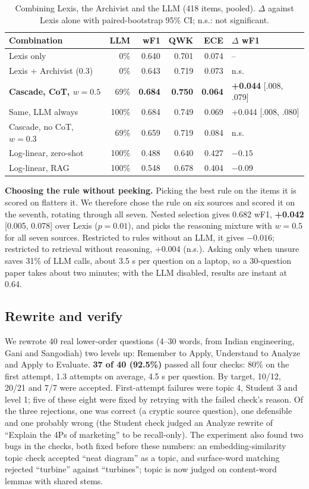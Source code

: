 \documentclass[conference]{IEEEtran}
\newcommand{\best}[1]{\textbf{#1}}
\begin{document}
\begin{table}[t]
\caption{Combining Lexis, the Archivist and the LLM (418 items, pooled). $\Delta$ against Lexis
alone with paired-bootstrap 95\% CI; n.s.: not significant.}
\label{tab:arbiter}
\centering\scriptsize
\setlength{\tabcolsep}{2pt}
\begin{tabular}{@{}lrrrrl@{}}
\toprule
Combination & LLM & wF1 & QWK & ECE & $\Delta$ wF1 \\
\midrule
Lexis only & 0\% & 0.640 & 0.701 & 0.074 & -- \\
Lexis + Archivist (0.3) & 0\% & 0.643 & 0.719 & 0.073 & n.s. \\
\best{Cascade, CoT, $w{=}0.5$} & 69\% & \best{0.684} & \best{0.750} & \best{0.064} & \best{+0.044} [.008, .079] \\
Same, LLM always & 100\% & 0.684 & 0.749 & 0.069 & +0.044 [.008, .080] \\
Cascade, no CoT, $w{=}0.3$ & 69\% & 0.659 & 0.719 & 0.084 & n.s. \\
Log-linear, zero-shot & 100\% & 0.488 & 0.640 & 0.427 & $-0.15$ \\
Log-linear, RAG & 100\% & 0.548 & 0.678 & 0.404 & $-0.09$ \\
\bottomrule
\end{tabular}
\end{table}

\textbf{Choosing the rule without peeking.} Picking the best rule on the items it is scored on
flatters it. We therefore chose the rule on six sources and scored it on the seventh, rotating
through all seven. Nested selection gives 0.682 wF1, \textbf{+0.042} [0.005, 0.078] over Lexis
($p=0.01$), and picks the reasoning mixture with $w=0.5$ for all seven sources. Restricted to
rules without an LLM, it gives $-0.016$; restricted to retrieval without reasoning, +0.004
(n.s.). Asking only when unsure saves 31\% of LLM calls, about 3.5 s per question on a laptop,
so a 30-question paper takes about two minutes; with the LLM disabled, results are instant at
0.64.

\subsection{Rewrite and verify}
We rewrote 40 real lower-order questions (4--30 words, from Indian engineering, Gani and
Sangodiah) two levels up: Remember to Apply, Understand to Analyze and Apply to Evaluate.
\textbf{37 of 40 (92.5\%)} passed all four checks: 80\% on the first attempt, 1.3 attempts on
average, 4.5 s per question. By target, 10/12, 20/21 and 7/7 were accepted. First-attempt
failures were topic 4, Student 3 and level 1; five of these eight were fixed by retrying with the
failed check's reason. Of the three rejections, one was correct (a cryptic source question),
one defensible and one probably wrong (the Student check judged an Analyze rewrite of ``Explain
the 4Ps of marketing'' to be recall-only). The experiment also found two bugs in the checks, both
fixed before these numbers: an embedding-similarity topic check accepted ``neat diagram'' as a
topic, and surface-word matching rejected ``turbine'' against ``turbines''; topic is now judged on
content-word lemmas with shared stems.
\end{document}

